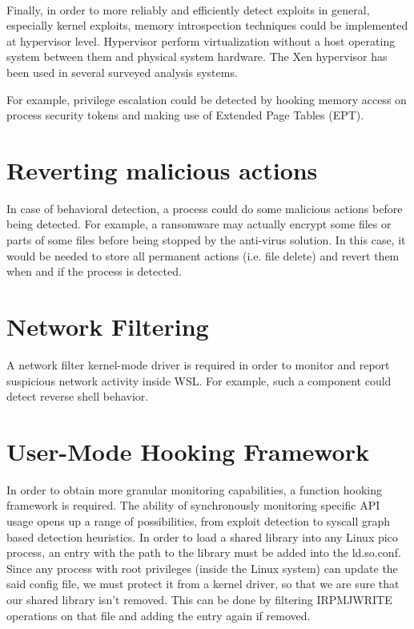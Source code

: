        \paragraph{}
        Finally, in order to more reliably and efficiently detect exploits in general, especially kernel exploits, memory introspection
        techniques could be implemented at hypervisor level. Hypervisor perform virtualization without a host operating system between them
        and physical system hardware\cite{Bulazel}. The Xen hypervisor \cite{Barham} has been used in several surveyed analysis systems.
        
        For example, privilege escalation could be detected by hooking memory access on process security tokens and making use of Extended
        Page Tables (EPT).
        
    \section{Reverting malicious actions}
        In case of behavioral detection, a process could do some malicious actions before being detected. For example, a ransomware may actually
        encrypt some files or parts of some files before being stopped by the anti-virus solution. In this case, it would be needed to store all
        permanent actions (i.e. file delete) and revert them when and if the process is detected.

    \section{Network Filtering}
        A network filter kernel-mode driver is required in order to monitor and report suspicious network activity inside WSL. For example, such
        a component could detect reverse shell behavior.

    \section{User-Mode Hooking Framework}
        In order to obtain more granular monitoring capabilities, a function hooking framework is required. The ability of synchronously monitoring
        specific API usage opens up a range of possibilities, from exploit detection to syscall graph based detection heuristics.
        In order to load a shared library into any Linux pico process, an entry with the path to the library must be added into the ld.so.conf. Since
        any process with root privileges (inside the Linux system) can update the said config file, we must protect it from a kernel driver, so that
        we are sure that our shared library isn't removed. This can be done by filtering IRP\textunderscore MJ\textunderscore WRITE operations on that
        file and adding the entry again if removed.
        
